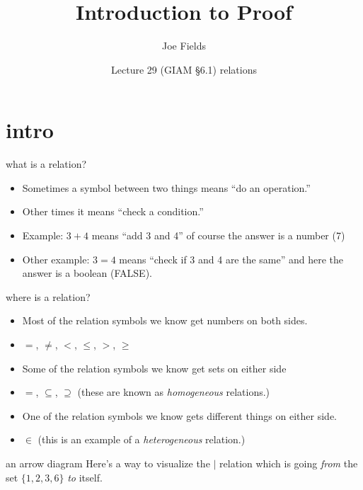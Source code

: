 \documentclass[handout,landscape]{beamer}
\author{Joe Fields}
\title{Introduction to Proof}
\date{Lecture 29 (GIAM \S 6.1) \newline relations}
\institute[SCSU]{ {\tt fieldsj1@southernct.edu} }
\begin{document}
\begin{frame}[plain]
  \titlepage
\end{frame}

\section{intro}

\begin{frame}{what is a relation?}
\begin{itemize}
\item Sometimes a symbol between two things means ``do an operation.'' \pause
\item Other times it means ``check a condition.'' \pause
\item Example: $3+4$ means ``add 3 and 4'' of course the answer is a number (7) \pause
\item Other example: $3=4$ means ``check if 3 and 4 are the same'' and here the answer is a boolean (FALSE).
\end{itemize}
\end{frame}

\begin{frame}{where is a relation?}
\begin{itemize}
\item Most of the relation symbols we know get numbers on both sides. \pause
\item $=$,  $\neq$, $<$, $\leq$, $>$, $\geq$ \pause
\item Some of the relation symbols we know get sets on either side \pause
\item $=$, $\subseteq$, $\supseteq$ \pause \newline
(these are known as {\em homogeneous} relations.) \pause
\item One of the relation symbols we know gets different things on either side. \pause
\item $\in$ \pause \newline
(this is an example of a {\em heterogeneous} relation.)
\end{itemize}
\end{frame}

\begin{frame}{an arrow diagram}
Here's a way to visualize the $\mid$ relation which is going {\em from} the set $\{1,2,3,6\}$ {\em to} itself. \pause

\begin{center}

\end{center}   
\end{frame}
\end{document}
